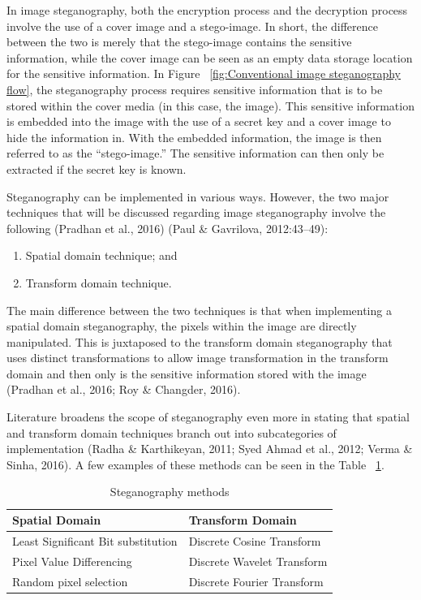 In image steganography, both the encryption process and the decryption process involve the use of a cover image and a stego-image. In short, the difference between the two is merely that the stego-image contains the sensitive information, while the cover image can be seen as an empty data storage location for the sensitive information. In Figure ~\ref{fig:Conventional image steganography flow}, the steganography process requires sensitive information that is to be stored within the cover media (in this case, the image). This sensitive information is embedded into the image with the use of a secret key and a cover image to hide the information in. With the embedded information, the image is then referred to as the “stego-image.” The sensitive information can then only be extracted if the secret key is known.

Steganography can be implemented in various ways. However, the two major techniques that will be discussed regarding image steganography involve the following (Pradhan et al., 2016) (Paul \& Gavrilova, 2012:43–49):

\begin{enumerate}[label=\roman*.]
	\item Spatial domain technique; and 
	\item Transform domain technique.
\end{enumerate}

The main difference between the two techniques is that when implementing a spatial domain steganography, the pixels within the image are directly manipulated. This is juxtaposed to the transform domain steganography that uses distinct transformations to allow image transformation in the transform domain and then only is the sensitive information stored with the image (Pradhan et al., 2016; Roy \& Changder, 2016).

Literature broadens the scope of steganography even more in stating that spatial and transform domain techniques branch out into subcategories of implementation (Radha \& Karthikeyan, 2011; Syed Ahmad et al., 2012; Verma \& Sinha, 2016). A few examples of these methods can be seen in the Table ~\ref{table: Steganography methods}.

\begin{table}[h]
\caption{Steganography methods}
\centering
 \begin{tabular}{|p{} | p{}|} 
 \hline
	\textbf{Spatial Domain} & \textbf{Transform Domain} \\ [1ex] 
 \hline\hline 
 Least Significant Bit substitution & Discrete Cosine Transform  \\[1ex]
 \hline 
 Pixel Value Differencing & Discrete Wavelet Transform  \\[1ex]
 \hline
 Random pixel selection & Discrete Fourier Transform  \\ [1ex] 
 \hline
 \end{tabular}
 \label{table: Steganography methods}
\end{table}



